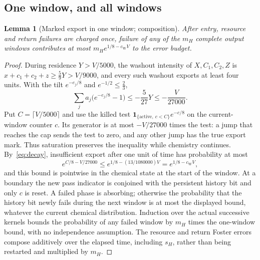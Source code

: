 \documentclass[11pt,a4paper]{article}
\theoremstyle{plain}
\newtheorem{lemma}[theorem]{Lemma}
\theoremstyle{definition}
\theoremstyle{remark}
\newcommand{\ind}{\mathbf 1}
\newcommand{\cW}{c_{\mathrm W}}
\begin{document}
\subsection{One window, and all windows}
\begin{lemma}[Marked export in one window; composition]\label{lem:windows}
After entry, resource and return failures are charged once, failure of any of the $m_H$ complete output windows contributes at most $m_He^{1/8-\cW V}$ to the error budget.
\end{lemma}
\begin{proof}
During residence $Y>V/5000$, the washout intensity of $X,C_1,C_2,Z$ is $x+c_1+c_2+z\ge\frac59Y>V/9000$, and every such washout exports at least four units. With the tilt $e^{-e_j/8}$ and $e^{-1/2}\le\frac23$,
\[
 \sum_ja_j\big(e^{-e_j/8}-1\big)\le-\frac5{27}Y\le-\frac V{27000}.
\]
Put $C=\lceil V/5000\rceil$ and use the killed test $\ind_{\{\text{active},\ c<C\}}e^{-c/8}$ on the current-window counter $c$. Its generator is at most $-V/27000$ times the test: a jump that reaches the cap sends the test to zero, and any other jump has the true export mark. Thus saturation preserves the inequality while chemistry continues. By~\eqref{eq:decay}, insufficient export after one unit of time has probability at most
\[
 e^{C/8-V/27000}\le e^{1/8-(13/1080000)V}=e^{1/8-\cW V},
\]
and this bound is pointwise in the chemical state at the start of the window. At a boundary the new pass indicator is conjoined with the persistent history bit and only $c$ is reset. A failed phase is absorbing; otherwise the probability that the history bit newly fails during the next window is at most the displayed bound, whatever the current chemical distribution. Induction over the actual successive kernels bounds the probability of any failed window by $m_H$ times the one-window bound, with no independence assumption. The resource and return Foster errors compose additively over the elapsed time, including $s_H$, rather than being restarted and multiplied by $m_H$.
\end{proof}
\end{document}
